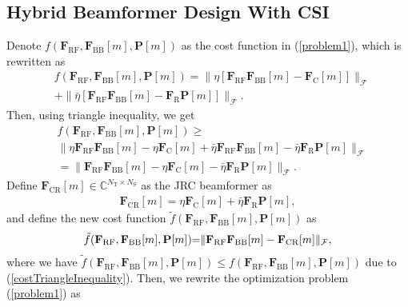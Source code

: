 \documentclass[journal,10pt]{IEEEtran}
\begin{document}
	\subsection{Hybrid Beamformer Design With CSI}
	\label{sec:HBdesignCSI} {\color{black}
		Denote $f(\mathbf{F}_\mathrm{RF}, \mathbf{F}_\mathrm{BB}[m],\mathbf{P}[m])$ as the cost function in (\ref{problem1}), which is rewritten as
		\begin{align}
		&f(\mathbf{F}_\mathrm{RF}, \mathbf{F}_\mathrm{BB}[m],\mathbf{P}[m]) = \|\eta[\mathbf{F}_\mathrm{RF}\mathbf{F}_\mathrm{BB}[m]  -  \mathbf{F}_\mathrm{C}[m]]\|_\mathcal{F} \nonumber \\
		& + \|\bar{\eta}[\mathbf{F}_\mathrm{RF}\mathbf{F}_\mathrm{BB}[m]  -  \mathbf{F}_\mathrm{R}\mathbf{P}[m]]\|_\mathcal{F}.
		\end{align}
		Then, using triangle inequality, we get 
		\begin{align}
		\label{costTriangleInequality}
		&f(\mathbf{F}_\mathrm{RF}, \mathbf{F}_\mathrm{BB}[m],\mathbf{P}[m]) \geq  \nonumber \\
		& \|\eta\mathbf{F}_\mathrm{RF}\mathbf{F}_\mathrm{BB}[m] -\eta\mathbf{F}_\mathrm{C}[m] + \bar{\eta} \mathbf{F}_\mathrm{RF}\mathbf{F}_\mathrm{BB}[m] -\bar{\eta} \mathbf{F}_\mathrm{R}\mathbf{P}[m] \|_\mathcal{F} \nonumber \\
		& =  \|\mathbf{F}_\mathrm{RF}\mathbf{F}_\mathrm{BB}[m] -\eta\mathbf{F}_\mathrm{C}[m]  - \bar{\eta} \mathbf{F}_\mathrm{R}\mathbf{P}[m] \|_\mathcal{F}.
		\end{align}
		Define $\mathbf{F}_\mathrm{CR}[m]\in \mathbb{C}^{N_\mathrm{T}\times N_\mathrm{S}}$ as the JRC beamformer as
		\begin{align}
		\mathbf{F}_\mathrm{CR}[m] = \eta\mathbf{F}_\mathrm{C} [m] + \bar{\eta} \mathbf{F}_\mathrm{R}\mathbf{P}[m],
		\end{align}
		and define the new cost function $\tilde{f}(\mathbf{F}_\mathrm{RF}, \mathbf{F}_\mathrm{BB}[m],\mathbf{P}[m]) $ as 
		\begin{align}
		\tilde{f}(\mathbf{F}_\mathrm{RF}, \mathbf{F}_\mathrm{BB}[m],\mathbf{P}[m]) \hspace{-3pt}= \hspace{-3pt} \|\mathbf{F}_\mathrm{RF}\mathbf{F}_\mathrm{BB}[m] -\mathbf{F}_\mathrm{CR}[m] \|_\mathcal{F},
		\end{align}
		where we have $\tilde{f}(\mathbf{F}_\mathrm{RF}, \mathbf{F}_\mathrm{BB}[m],\mathbf{P}[m])  \leq {f}(\mathbf{F}_\mathrm{RF}, \mathbf{F}_\mathrm{BB}[m],\mathbf{P}[m]) $ due to (\ref{costTriangleInequality}). Then, we rewrite the optimization problem (\ref{problem1}) as
}
\end{document}
